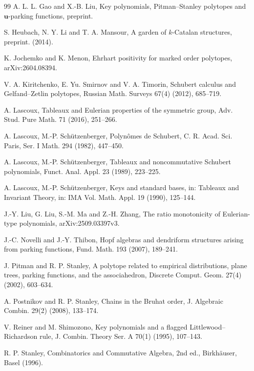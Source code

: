 \documentclass[12pt]{article}
\numberwithin{equation}{section}
\begin{document}
\begin{thebibliography}{99}
A. L. L. Gao and X.-B. Liu, Key polynomials, Pitman–Stanley polytopes and $\mathbf{u}$-parking functions, preprint.

S. Heubach, N. Y. Li and T. A. Mansour, A garden of $k$-Catalan structures, preprint. (2014). 

K. Jochemko and K. Menon, Ehrhart positivity for marked order polytopes, arXiv:2604.08394.

V. A. Kiritchenko, E. Yu. Smirnov and V. A. Timorin, Schubert calculus and Gelfand--Zetlin polytopes, Russian Math. Surveys 67(4) (2012), 685--719.

A. Lascoux, Tableaux and Eulerian properties of the symmetric group, Adv. Stud. Pure Math. 71 (2016), 251--266.

A. Lascoux, M.-P. Sch\"utzenberger, Polyn\^omes de Schubert, C. R. Acad. Sci. Paris, Ser. I Math. 294 (1982), 447--450.  %

A. Lascoux, M.-P. Sch\"utzenberger, Tableaux and noncommutative Schubert polynomials, Funct. Anal. Appl. 23 (1989), 223--225. 

A. Lascoux, M.-P. Sch\"utzenberger, Keys and standard bases, in: Tableaux and Invariant Theory, in: IMA Vol. Math. Appl. 19 (1990), 125--144.

J.-Y. Liu, G. Liu, S.-M. Ma and Z.-H. Zhang, The ratio monotonicity of Eulerian-type polynomials, arXiv:2509.03397v3.

J.-C. Novelli and J.-Y. Thibon, 
Hopf algebras and dendriform structures arising from parking functions, 
Fund. Math. 193 (2007), 189--241.

J. Pitman and R. P. Stanley, A polytope related to empirical distributions, plane trees, parking functions, and the associahedron, Discrete Comput. Geom. 27(4) (2002), 603--634.

A. Postnikov and R. P. Stanley, Chains in the Bruhat order, J. Algebraic Combin. 29(2) (2008), 133--174.

V. Reiner and M. Shimozono, Key polynomials and a flagged Littlewood--Richardson rule, J. Combin. Theory Ser. A 70(1) (1995), 107--143. 

R. P. Stanley, Combinatorics and Commutative Algebra, 2nd ed., Birkh\"auser, Basel (1996).


\end{thebibliography}
\end{document}
